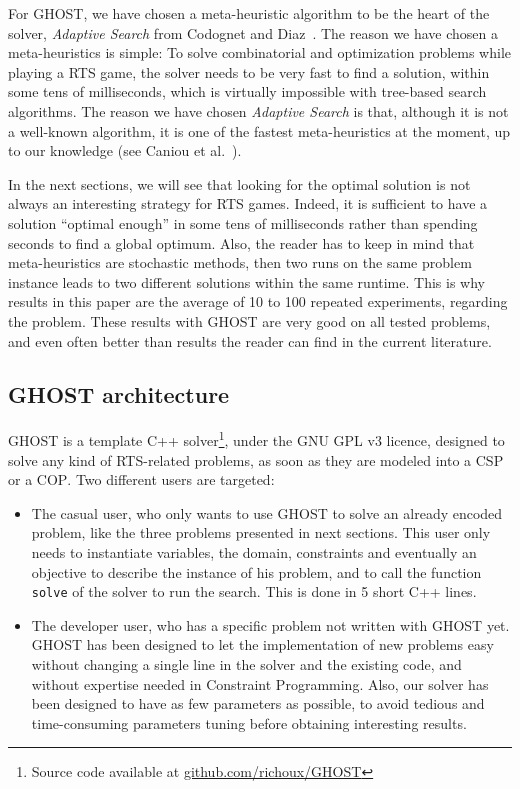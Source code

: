 \documentclass[journal]{IEEEtran}
\newcommand{\csp}{\textsc{CSP}\xspace}
\newcommand{\cop}{\textsc{COP}\xspace}
\newcommand{\ghost}{\textsc{GHOST}\xspace}
\begin{document}
For \ghost, we have chosen a  meta-heuristic algorithm to be the heart
of   the   solver,   {\it   Adaptive   Search}   from   Codognet   and
Diaz~\cite{Codognet01}. The reason we have chosen a meta-heuristics is
simple: To solve combinatorial and optimization problems while playing
a RTS  game, the  solver needs  to be  very fast  to find  a solution,
within some tens  of milliseconds, which is  virtually impossible with
tree-based search algorithms. The reason  we have chosen {\it Adaptive
  Search} is  that, although it is  not a well-known algorithm,  it is
one of the fastest meta-heuristics at  the moment, up to our knowledge
(see Caniou et al.~\cite{Caniou14}).

In  the next  sections,  we  will see  that  looking  for the  optimal
solution is not always an  interesting strategy for RTS games. Indeed,
it is sufficient to have a solution ``optimal enough'' in some tens of
milliseconds   rather  than   spending  seconds   to  find   a  global
optimum. Also, the reader has to keep in mind that meta-heuristics are
stochastic methods, then  two runs on the same  problem instance leads
to  two different  solutions within  the  same runtime.   This is  why
results  in  this  paper  are  the  average  of  10  to  100  repeated
experiments,  regarding the  problem.  These  results with  \ghost are
very good on  all tested problems, and even often  better than results
the reader can find in the current literature.

\subsection{\ghost architecture}

\ghost  is a  template  C++ solver\footnote{Source  code available  at
  \href{https://github.com/richoux/GHOST}{github.com/richoux/GHOST}},
under  the  GNU  GPL  v3  licence,  designed  to  solve  any  kind  of
RTS-related problems,  as soon as  they are modeled  into a \csp  or a
\cop. Two different users are targeted:
\begin{itemize}
\item  The casual  user, who  only  wants to  use \ghost  to solve  an
  already encoded problem,  like the three problems  presented in next
  sections.   This  user  only  needs to  instantiate  variables,  the
  domain,  constraints and  eventually  an objective  to describe  the
  instance of his problem, and  to call the function \texttt{solve} of
  the solver to run the search. This is done in 5 short C++ lines.
\item The developer user, who has  a specific problem not written with
  \ghost yet.  \ghost  has been designed to let  the implementation of
  new problems easy  without changing a single line in  the solver and
  the  existing  code,  and  without expertise  needed  in  Constraint
  Programming.   Also, our  solver has  been designed  to have  as few
  parameters  as   possible,  to  avoid  tedious   and  time-consuming
  parameters tuning before obtaining interesting results.
\end{itemize}
\end{document}
